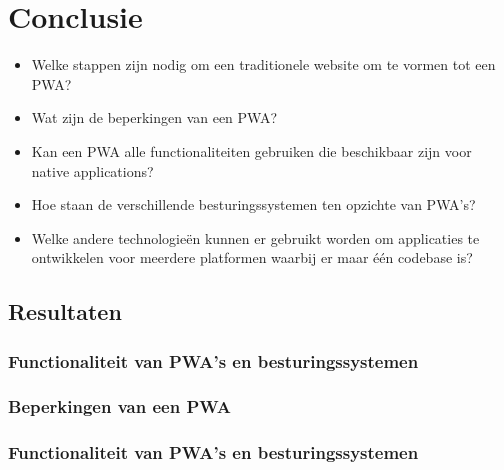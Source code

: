 
\chapter{Conclusie}
\label{ch:conclusie}


\begin{itemize}
		  \item Welke stappen zijn nodig om een traditionele website om te vormen tot een PWA?
		  \item Wat zijn de beperkingen van een PWA?
		  \item Kan een PWA alle functionaliteiten gebruiken die beschikbaar zijn voor native applications?
		  \item Hoe staan de verschillende besturingssystemen ten opzichte van PWA's?
		  \item Welke andere technologieën kunnen er gebruikt worden om applicaties te ontwikkelen voor meerdere platformen waarbij er maar één codebase is?
	  \end{itemize}
	  

\section{Resultaten}
\subsection{Functionaliteit van PWA's en besturingssystemen}
\subsection{Beperkingen van een PWA}
\subsection{Functionaliteit van PWA's en besturingssystemen}
